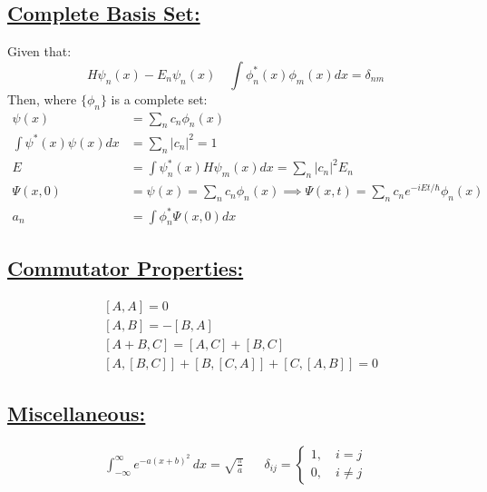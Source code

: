 \documentclass[a4paper,12pt]{article}
\begin{document}
\subsection*{\underline{Complete Basis Set:}}
Given that:
\begin{equation*}
    H\psi_n(x)-E_n\psi_n(x)\quad \int\phi^*_n(x)\phi_m(x)dx=\delta_{nm}
\end{equation*}
Then, where $\{\phi_n\}$ is a complete set:
\begin{align*}
    \psi(x)&=\sum_nc_n\phi_n(x)\\
    \int\psi^*(x)\psi(x)dx&=\sum_n|c_n|^2=1\\
    E&=\int\psi^*_n(x)H\psi_m(x)dx=\sum_n|c_n|^2E_n\\
    \Psi(x,0)&=\psi(x)=\sum_nc_n\phi_n(x)\implies\Psi(x,t)=\sum_nc_ne^{-iEt/\hbar}\phi_n(x)\\
    a_n&=\int\phi_n^*\Psi(x,0)dx
\end{align*}
\subsection*{\underline{Commutator Properties:}}
\begin{align*}
    &[A,A]=0\\
    &[A,B]=-[B,A]\\
    &[A+B,C]=[A,C]+[B,C]\\
    &[A,[B,C]]+[B,[C,A]]+[C,[A,B]]=0
\end{align*}
\subsection*{\underline{Miscellaneous:}}
\begin{align*}
    \int_{-\infty}^\infty e^{-a(x+b)^2}\, dx=\sqrt{\frac{\pi}{a}}& 
    &\delta_{ij}=\left\{
        \begin{matrix}
            1,\quad i=j\\
            0,\quad i\neq j
        \end{matrix}
    \right.
\end{align*}
\end{document}
